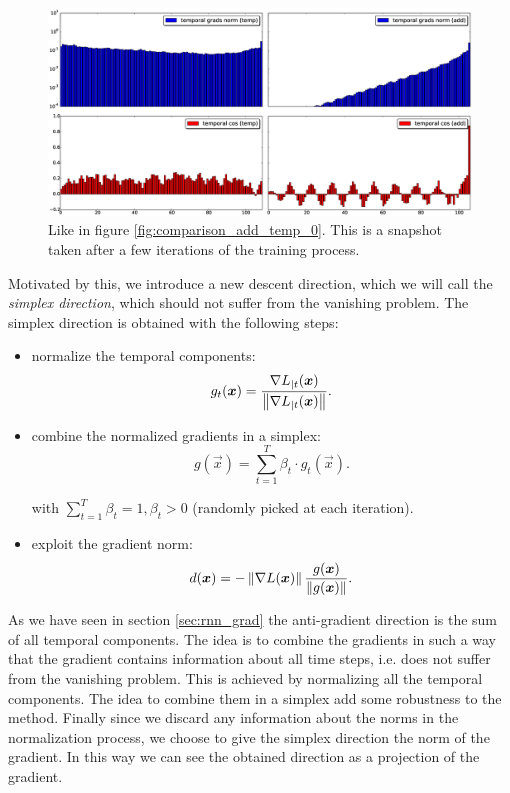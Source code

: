 \begin{figure}[h]
	\includegraphics[width=1\textwidth]{chapter3/compare_add_temp_norms_1.eps}
	\caption{Like in figure \ref{fig:comparison_add_temp_0}. This is a snapshot taken after a few iterations of the training process.}
	\label{fig:comparison_add_temp_1}
\end{figure}


Motivated by this, we introduce a new descent direction, which we will call the \textit{simplex direction},
which should not suffer from the vanishing problem. The simplex direction is obtained with the following steps:


\begin{itemize}
	\item normalize the temporal components:
	\begin{equation}
	g_t(\boldsymbol{x}) = \frac{\nabla L_{|t}(\boldsymbol{x})}{\left\Vert \nabla L_{|t}(\boldsymbol{x}) \right\Vert}.
	\end{equation}
	
	\item combine the normalized gradients in a simplex:
	\begin{equation}
	g(\vec{x}) = \sum_{t=1}^T \beta_t \cdot g_t(\vec{x}).
	\end{equation}
	
	with $\sum_{t=1}^T\beta_t=1, \beta_t>0$ (randomly picked at each iteration).
	\item exploit the gradient norm:
	\begin{equation}
	d(\boldsymbol{x}) = - \left\Vert \nabla L (\boldsymbol{x}) \right\Vert\frac{g(\boldsymbol{x})}{\left\Vert g(\boldsymbol{x}) \right\Vert}.
	\end{equation}
\end{itemize}

As we have seen in section \ref{sec:rnn_grad} the anti-gradient direction is the sum of all temporal components. The idea is to combine the gradients in such a way that the gradient contains information about all time steps, i.e. does not suffer from the vanishing problem. This is achieved by normalizing all the temporal components. The idea to combine them in a simplex add some robustness to the method. Finally since we discard any information about the norms in the normalization process, we choose to give the simplex direction the norm of the gradient. In this way we can see the obtained direction as a projection of the gradient.


